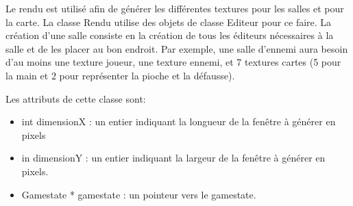 Le rendu est utilisé afin de générer les différentes textures pour les salles et pour la carte. La classe Rendu utilise des objets de classe Editeur pour ce faire. La création d'une salle consiste en la création de tous les éditeurs nécessaires à la salle et de les placer au bon endroit. Par exemple, une salle d'ennemi aura besoin d'au moins une texture joueur, une texture ennemi, et 7 textures cartes (5 pour la main et 2 pour représenter la pioche et la défausse).

Les attributs de cette classe sont:
\begin{itemize}
\item int dimensionX : un entier indiquant la longueur de la fenêtre à générer en pixels
\item in dimensionY : un entier indiquant la largeur de la fenêtre à générer en pixels.
\item Gamestate * gamestate : un pointeur vers le gamestate.
\end{itemize}

